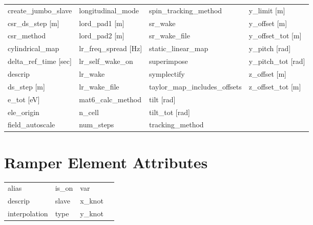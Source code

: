 \begin{tabular}{llll}
create_jumbo_slave               & longitudinal_mode                & spin_tracking_method             & y_limit [m]                      \\
csr_ds_step [m]                  & lord_pad1 [m]                    & sr_wake                          & y_offset [m]                     \\
csr_method                       & lord_pad2 [m]                    & sr_wake_file                     & y_offset_tot [m]                 \\
cylindrical_map                  & lr_freq_spread [Hz]              & static_linear_map                & y_pitch [rad]                    \\
delta_ref_time [sec]             & lr_self_wake_on                  & superimpose                      & y_pitch_tot [rad]                \\
descrip                          & lr_wake                          & symplectify                      & z_offset [m]                     \\
ds_step [m]                      & lr_wake_file                     & taylor_map_includes_offsets      & z_offset_tot [m]                 \\
e_tot [eV]                       & mat6_calc_method                 & tilt [rad]                       &                                  \\
ele_origin                       & n_cell                           & tilt_tot [rad]                   &                                  \\
field_autoscale                  & num_steps                        & tracking_method                  &                                  \\
 \bottomrule
 \end{tabular}
 \vfill
 
 \section{Ramper Element Attributes}
 \label{s:list.ramper}
 
 \begin{tabular}{llll} \toprule
alias                            & is_on                            & var                              &                                  \\
descrip                          & slave                            & x_knot                           &                                  \\
interpolation                    & type                             & y_knot                           &                                  \\
 \bottomrule
 \end{tabular}
 \vfill
 

